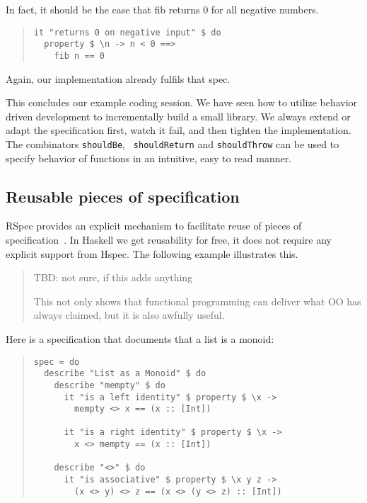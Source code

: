 \documentclass[preprint]{sigplanconf}
\begin{document}
\noindent In fact, it should be the case that fib returns 0 for all
negative numbers.

\begin{quote}
\small
\begin{verbatim}
it "returns 0 on negative input" $ do
  property $ \n -> n < 0 ==>
    fib n == 0
\end{verbatim}
\end{quote}


\noindent Again, our implementation already fulfils that spec.

This concludes our example coding session.  We have seen how to utilize
behavior driven development to incrementally build a small library.
We always extend or adapt the specification first, watch it fail,  and
then tighten the implementation.  The combinators {\tt shouldBe}, {\tt
shouldReturn} and {\tt shouldThrow} can be used to specify behavior of
functions in an intuitive, easy to read manner.

\subsection{Reusable pieces of specification}
\label{sec:reusable-specs}

RSpec provides an explicit mechanism to facilitate reuse of pieces of
specification~\cite{rspec}.
In Haskell we get reusability for free, it does not require any
explicit support from Hspec.
The following example illustrates this.

\begin{quote}
  TBD: not sure, if this adds anything

This not only shows that functional programming can deliver what OO
has always claimed, but it is also awfully useful.
\end{quote}
Here is a specification that documents that a list is a monoid:

\begin{quote}
\small
\begin{verbatim}
spec = do
  describe "List as a Monoid" $ do
    describe "mempty" $ do
      it "is a left identity" $ property $ \x ->
        mempty <> x == (x :: [Int])

      it "is a right identity" $ property $ \x ->
        x <> mempty == (x :: [Int])

    describe "<>" $ do
      it "is associative" $ property $ \x y z ->
        (x <> y) <> z == (x <> (y <> z) :: [Int])
\end{verbatim}
\end{quote}
\end{document}
